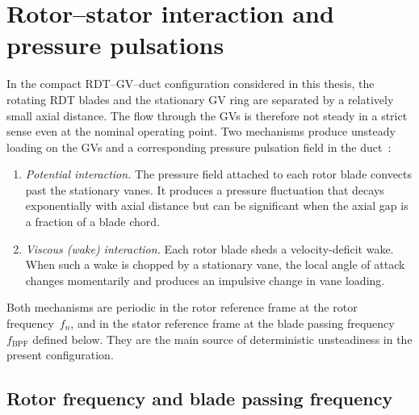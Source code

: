 
\section{Rotor--stator interaction and pressure pulsations}
\label{sec:rsi}

In the compact \ac{RDT}--\ac{GV}--duct configuration considered in
this thesis, the rotating \ac{RDT} blades and the stationary \ac{GV}
ring are separated by a relatively small axial distance. The flow
through the \acp{GV} is therefore not steady in a strict sense even
at the nominal operating point. Two mechanisms produce unsteady
loading on the \acp{GV} and a corresponding pressure pulsation field
in the duct~\cite{brekke,arndt1990}:
\begin{enumerate}
  \item \emph{Potential interaction.} The pressure field attached to
        each rotor blade convects past the stationary vanes. It
        produces a pressure fluctuation that decays exponentially
        with axial distance but can be significant when the axial
        gap is a fraction of a blade chord.
  \item \emph{Viscous (wake) interaction.} Each rotor blade sheds a
        velocity-deficit wake. When such a wake is chopped by a
        stationary vane, the local angle of attack changes
        momentarily and produces an impulsive change in vane loading.
\end{enumerate}
Both mechanisms are periodic in the rotor reference frame at the
rotor frequency~$f_n$, and in the stator reference frame at the
blade passing frequency~$f_{\mathrm{BPF}}$ defined below. They are
the main source of deterministic unsteadiness in the present
configuration.

\subsection{Rotor frequency and blade passing frequency}
\label{sec:rsi-bpf}

